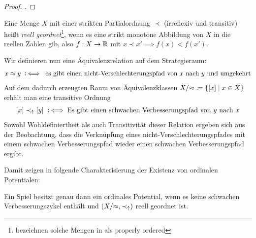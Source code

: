 \begin{proof}.
	
\end{proof}


\begin{defn}
	Eine Menge $X$ mit einer strikten Partialordnung $\prec$ (irreflexiv und transitiv) heißt \emph{reell geordnet}\footnote{\citeauthor{CharExOrdPot} bezeichnen solche Mengen in \cite{CharExOrdPot} als \glqq properly ordered\grqq}, wenn es eine strikt monotone Abbildung von $X$ in die reellen Zahlen gib, also $f: X \to \mathbb{R}$ mit $x \prec x' \implies f(x) < f(x')$.
\end{defn}

Wir definieren nun eine Äquivalenzrelation auf dem Strategieraum:
	\[x \approx y \mathbin{~\mathop:\!\!\iff} \text{ es gibt einen nicht-Verschlechterungspfad von $x$ nach $y$ und umgekehrt}\]
Auf dem dadurch erzeugten Raum von Äquivalenzklassen $X/{\approx} \coloneqq \left\lbrace[x] \mid x \in X\right\rbrace$ erhält man eine transitive Ordnung
	\[[x] \prec_\uparrow [y] \mathbin{~\mathop:\!\!\iff} \text{Es gibt einen schwachen Verbesserungspfad von $y$ nach $x$}\]
Sowohl Wohldefiniertheit als auch Transitivität dieser Relation ergeben sich aus der Beobachtung, dass die Verknüpfung eines nicht-Verschlechterungspfades mit einem schwachen Verbesserungspfad wieder einen schwachen Verbesserungspfad ergibt.

Damit zeigen \citeauthor{CharExOrdPot} in \cite[Theorem 3.1]{CharExOrdPot} folgende Charakterisierung der Existenz von ordinalen Potentialen:

\begin{satz}\label{satz:CharOrdPot}
	Ein Spiel besitzt genau dann ein ordinales Potential, wenn es keine schwachen Verbesserungszykel enthält und $(X/{\approx}, \prec_\uparrow)$ reell geordnet ist.
\end{satz}

